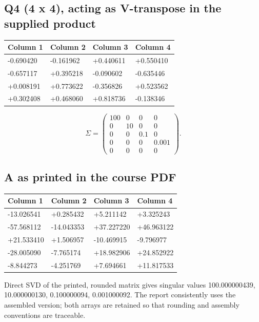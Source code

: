 \documentclass[a4paper,11pt]{article}
\begin{document}
\subsection*{Q4 (4 x 4), acting as V-transpose in the supplied product}
\begin{center}\fontsize{8.5}{10.5}\selectfont\begin{tabular}{@{}llll@{}}\toprule
Column 1 & Column 2 & Column 3 & Column 4\\\midrule
-0.690420 & -0.161962 & +0.440611 & +0.550410\\
-0.657117 & +0.395218 & -0.090602 & -0.635446\\
+0.008191 & +0.773622 & -0.356826 & +0.523562\\
+0.302408 & +0.468060 & +0.818736 & -0.138346\\
\bottomrule\end{tabular}\end{center}
\[\Sigma=\begin{pmatrix}100&0&0&0\\0&10&0&0\\0&0&0.1&0\\0&0&0&0.001\\0&0&0&0\end{pmatrix}.\]
\subsection*{A as printed in the course PDF}
\begin{center}\fontsize{8.5}{10.5}\selectfont\begin{tabular}{@{}llll@{}}\toprule
Column 1 & Column 2 & Column 3 & Column 4\\\midrule
-13.026541 & +0.285432 & +5.211142 & +3.325243\\
-57.568112 & -14.043353 & +37.227220 & +46.963122\\
+21.533410 & +1.506957 & -10.469915 & -9.796977\\
-28.005090 & -7.765174 & +18.982906 & +24.852922\\
-8.844273 & -4.251769 & +7.694661 & +11.817533\\
\bottomrule\end{tabular}\end{center}
Direct SVD of the printed, rounded matrix gives singular values 100.000000439, 10.000000130, 0.100000094, 0.001000092. The report consistently uses the assembled version; both arrays are retained so that rounding and assembly conventions are traceable.
\end{document}
